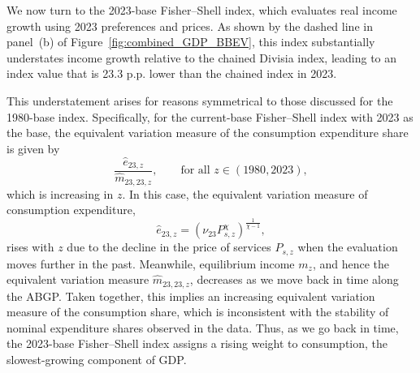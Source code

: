 \documentclass[12pt,a4paper]{article}
\newcommand{\red}[1]{\textcolor{red}{#1}} %
\begin{document}
We now turn to the 2023-base Fisher--Shell index, which evaluates real income growth using 2023 preferences and prices.  
As shown by the dashed line in panel~(b) of Figure~\ref{fig:combined_GDP_BBEV}, this index substantially understates income growth relative to the chained Divisia index, leading to an index value that is 23.3 p.p. lower than the chained index in 2023.

This understatement arises for reasons symmetrical to those discussed for the 1980-base index. 
Specifically, for the current-base Fisher--Shell index with 2023 as the base, the equivalent variation measure of the consumption expenditure share is given by  
\[
\frac{\widehat{e}_{23,z}}{\widehat{m}_{23,23,z}}, \qquad \text{for all } z \in (1980,2023),
\]  
which is increasing in \( z \).  
In this case, the equivalent variation measure of consumption expenditure,  
\[
\widehat{e}_{23,z} = \left( \nu_{23} P_{s,z}^\chi \right)^{\frac{1}{\chi - 1}},
\]  
rises with \( z \) due to the decline in the price of services \( P_{s,z} \) when the evaluation moves further in the past.  
Meanwhile, equilibrium income \( m_z \), and hence the equivalent variation measure \( \widehat{m}_{23,23,z} \), decreases as we move back in time along the ABGP.  
Taken together, this implies an increasing equivalent variation measure of the consumption share, which is inconsistent with the stability of nominal expenditure shares observed in the data.
Thus, as we go back in time, the 2023-base Fisher--Shell index assigns a rising weight to consumption, %
the slowest-growing component of GDP.
\end{document}
